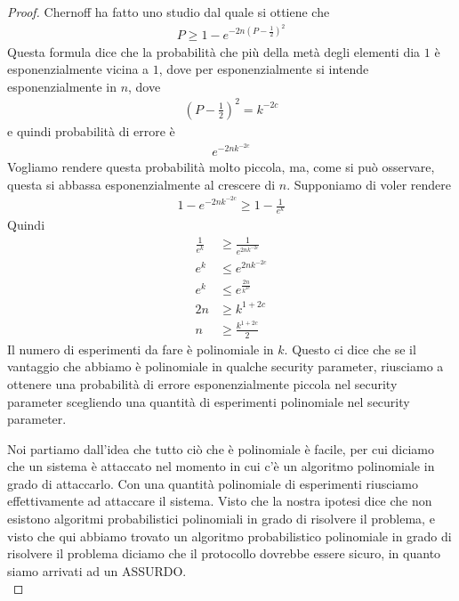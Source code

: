 \begin{proof}
Chernoff ha fatto uno studio dal quale si ottiene che 
\begin{align*}
    P \ge 1 - e^{-2n \left( P - \frac{1}{2} \right)^2}
\end{align*}
\noindent Questa formula dice che la probabilità che più della metà degli elementi dia $1$ è 
esponenzialmente vicina a $1$, dove per esponenzialmente si intende esponenzialmente in $n$, dove
\begin{align*}
    \left( P - \frac{1}{2} \right)^2 = k^{-2c}
\end{align*}
\noindent e quindi probabilità di errore è 
\begin{align*}
    e^{-2nk^{-2c}}
\end{align*}
\noindent Vogliamo rendere questa probabilità molto piccola, ma, come si può osservare, questa si abbassa esponenzialmente al crescere di $n$. Supponiamo di voler rendere
\begin{align*}
    1-e^{-2nk^{-2c}} \ge 1-\frac{1}{e^k}
\end{align*}
\noindent Quindi 
\begin{align*}
    \frac{1}{e^k} &\ge \frac{1}{e^{2nk^{-2c}}}\\
    e^k &\le e^{2nk^{-2c}}\\
    e^k &\le e^{\frac{2n}{k^{2c}}}\\
    2n &\ge k^{1+2c}\\
    n &\ge \frac{k^{1+2c}}{2}
\end{align*}
\noindent Il numero di esperimenti da fare è polinomiale in $k$. Questo ci dice che se il vantaggio che abbiamo è polinomiale in qualche security parameter, riusciamo a ottenere una probabilità di errore esponenzialmente piccola nel security parameter scegliendo una quantità di esperimenti polinomiale nel security parameter. 

Noi partiamo dall'idea che tutto ciò che è polinomiale è facile, per cui diciamo che un sistema è attaccato nel momento in cui c'è un algoritmo polinomiale in grado di attaccarlo. Con una quantità polinomiale di esperimenti riusciamo effettivamente ad attaccare il sistema. 
Visto che la nostra ipotesi dice che non esistono algoritmi probabilistici polinomiali in grado di risolvere il problema, e visto che qui abbiamo trovato un algoritmo probabilistico polinomiale in grado di risolvere il problema diciamo che il protocollo dovrebbe essere sicuro, in quanto siamo arrivati ad un ASSURDO.\\


\end{proof}

